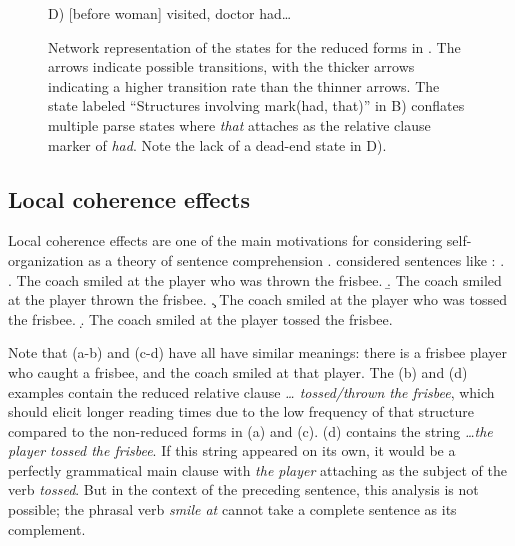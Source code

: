 \documentclass[a4paper, 12pt]{article}
\begin{document}
\begin{figure}[htbp]
\vspace{0.5cm}
D) [before woman] visited, doctor had\dots

\caption{Network representation of the states for the reduced forms in
    \protect\Last. The arrows indicate possible transitions, with the thicker
    arrows indicating a higher transition rate than the thinner arrows. The
    state labeled ``Structures involving mark(had, that)'' in B) conflates
    multiple parse states where \emph{that} attaches as the relative clause marker of
    \emph{had}. Note the lack of a dead-end state in D).}\label{fig:gpnetworks}
\end{figure}

\subsection{Local coherence effects}
Local coherence effects are one of the main motivations for considering
self-organization as a theory of sentence comprehension
\citep{tabor2004effects}. \citeauthor{tabor2004effects} considered sentences
like \Next: \ex. \a. The coach smiled at the player who was thrown the frisbee.
\b. The coach smiled at the player thrown the frisbee. \c. The coach
smiled at the player who was tossed the frisbee. \d. The coach smiled at the
player tossed the frisbee.

Note that \Last (a-b) and \Last (c-d) have all have similar meanings: there is
a frisbee player who caught a frisbee, and the coach smiled at that player. The
(b) and (d) examples contain the reduced relative clause \emph{\dots
    tossed/thrown the frisbee}, which should elicit longer reading times due to
the low frequency of that structure compared to the non-reduced forms in (a)
and (c). \Last (d) contains the string \emph{\dots the player tossed
    the frisbee}. If this string appeared on its own, it would be a perfectly
grammatical main clause with \emph{the player} attaching as the subject of the
verb \emph{tossed}. But in the context of the preceding sentence, this analysis
is not possible; the phrasal verb \emph{smile at} cannot take a complete
sentence as its complement.
\end{document}
